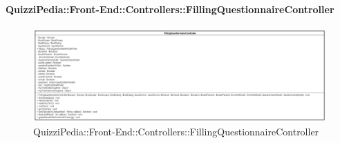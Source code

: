 \paragraph[QuizziPedia::Front-End::Controllers\\::FillingQuestionnaireController]{QuizziPedia::Front-End::Controllers::FillingQuestionnaireController}
\begin{figure} [ht]
	\centering
	\includegraphics[scale=0.45]{UML/Classi/Front-End/QuizziPedia_Front-end_Controller_FillingQuestionnaireController.png}
	\caption{QuizziPedia::Front-End::Controllers::FillingQuestionnaireController}
\end{figure} \FloatBarrier
